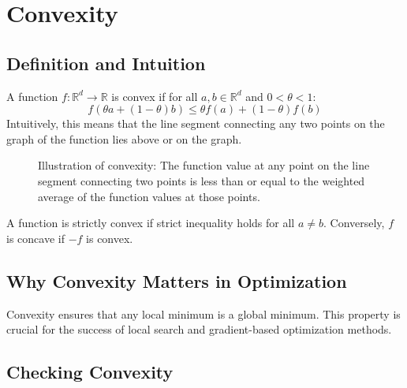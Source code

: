 \documentclass{article}
\begin{document}
\section{Convexity}

\subsection{Definition and Intuition}
A function $f: \mathbb{R}^d \rightarrow \mathbb{R}$ is convex if for all $a, b \in \mathbb{R}^d$ and $0 < \theta < 1$:
\[
f(\theta a + (1 - \theta) b) \leq \theta f(a) + (1 - \theta) f(b)
\]
Intuitively, this means that the line segment connecting any two points on the graph of the function lies above or on the graph.

\begin{figure}[h]
\centering
{}
\caption{Illustration of convexity: The function value at any point on the line segment connecting two points is less than or equal to the weighted average of the function values at those points.}
\end{figure}

A function is strictly convex if strict inequality holds for all $a \neq b$. Conversely, $f$ is concave if $-f$ is convex.

\subsection{Why Convexity Matters in Optimization}
Convexity ensures that any local minimum is a global minimum. This property is crucial for the success of local search and gradient-based optimization methods.

\subsection{Checking Convexity}
\end{document}
